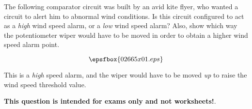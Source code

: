 

The following comparator circuit was built by an avid kite flyer, who wanted a circuit to alert him to abnormal wind conditions.  Is this circuit configured to act as a {\it high} wind speed alarm, or a {\it low} wind speed alarm?  Also, show which way the potentiometer wiper would have to be moved in order to obtain a higher wind speed alarm point.

$$\epsfbox{02665x01.eps}$$







This is a {\it high} speed alarm, and the wiper would have to be moved {\it up} to raise the wind speed threshold value.







{\bf This question is intended for exams only and not worksheets!}.




